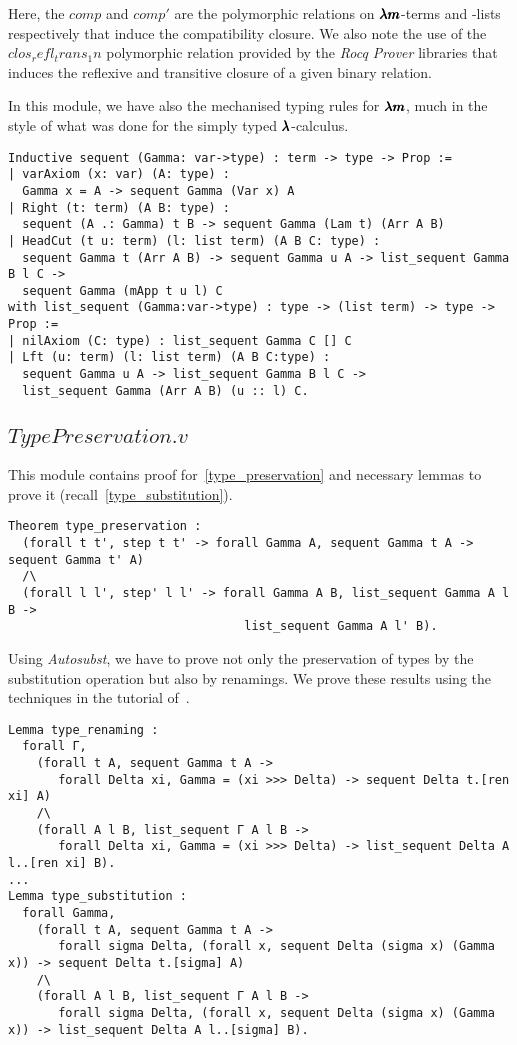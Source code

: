 Here, the \lst$comp$ and \lst$comp'$ are the polymorphic relations on $\pmb{\lambda m}$-terms and -lists respectively that induce the compatibility closure.
We also note the use of the \lst$clos_refl_trans_1n$ polymorphic relation provided by the \textit{Rocq Prover} libraries that induces the reflexive and transitive closure of a given binary relation.

In this module, we have also the mechanised typing rules for $\pmb{\lambda m}$, much in the style of what was done for the simply typed $\pmb{\lambda}$-calculus.
\begin{lstlisting}[language=Coq]
Inductive sequent (Gamma: var->type) : term -> type -> Prop := 
| varAxiom (x: var) (A: type) :
  Gamma x = A -> sequent Gamma (Var x) A
| Right (t: term) (A B: type) :
  sequent (A .: Gamma) t B -> sequent Gamma (Lam t) (Arr A B)
| HeadCut (t u: term) (l: list term) (A B C: type) :
  sequent Gamma t (Arr A B) -> sequent Gamma u A -> list_sequent Gamma B l C ->
  sequent Gamma (mApp t u l) C
with list_sequent (Gamma:var->type) : type -> (list term) -> type -> Prop :=
| nilAxiom (C: type) : list_sequent Gamma C [] C
| Lft (u: term) (l: list term) (A B C:type) :
  sequent Gamma u A -> list_sequent Gamma B l C ->
  list_sequent Gamma (Arr A B) (u :: l) C.
\end{lstlisting}

\subsection{\lst$TypePreservation.v$}

This module contains proof for~\cref{type_preservation} and necessary lemmas to prove it (recall~\cref{type_substitution}).

\begin{lstlisting}[language=Coq]
Theorem type_preservation :
  (forall t t', step t t' -> forall Gamma A, sequent Gamma t A -> sequent Gamma t' A)
  /\
  (forall l l', step' l l' -> forall Gamma A B, list_sequent Gamma A l B ->
                                 list_sequent Gamma A l' B).
\end{lstlisting}

Using \textit{Autosubst}, we have to prove not only the preservation of types by the substitution operation but also by renamings.
We prove these results using the techniques in the tutorial of~\cite{AutosubstManual}.

\begin{lstlisting}[language=Coq]
Lemma type_renaming :
  forall Γ,
    (forall t A, sequent Gamma t A ->
       forall Delta xi, Gamma = (xi >>> Delta) -> sequent Delta t.[ren xi] A)
    /\
    (forall A l B, list_sequent Γ A l B ->
       forall Delta xi, Gamma = (xi >>> Delta) -> list_sequent Delta A l..[ren xi] B).
...
Lemma type_substitution :
  forall Gamma, 
    (forall t A, sequent Gamma t A ->
       forall sigma Delta, (forall x, sequent Delta (sigma x) (Gamma x)) -> sequent Delta t.[sigma] A)
    /\
    (forall A l B, list_sequent Γ A l B ->
       forall sigma Delta, (forall x, sequent Delta (sigma x) (Gamma x)) -> list_sequent Delta A l..[sigma] B).
\end{lstlisting}


